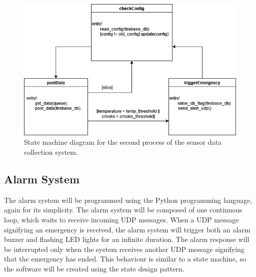 \begin{figure}[H]
    \centering
    \includegraphics[width=\linewidth]{../assets/state-machine/DataCollectionLogicLoop.png}
    \caption{State machine diagram for the second process of the sensor data collection system.}
\end{figure}

\subsection{Alarm System}

The alarm system will be programmed using the Python programming language, again for its simplicity. The alarm system
will be composed of one continuous loop, which waits to receive incoming UDP messages. When a UDP message signifying an
emergency is received, the alarm system will trigger both an alarm buzzer and flashing LED lights for an infinite
duration. The alarm response will be interrupted only when the system receives another UDP message signifying that the
emergency has ended. This behaviour is similar to a state machine, so the software will be created using the state
design pattern.

